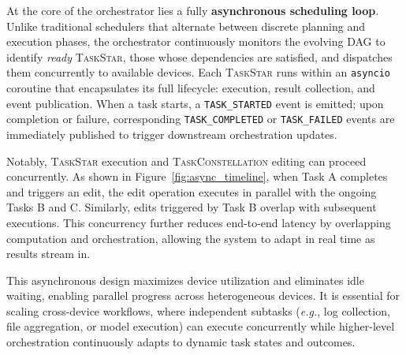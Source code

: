\documentclass[10pt]{article} %
\newcommand{\TaskConstellation}{\textsc{TaskConstellation}\xspace}
\newcommand{\TaskStar}{\textsc{TaskStar}\xspace}
\newcommand{\eg}{\textit{e.g.},\xspace}
\begin{document}
At the core of the orchestrator lies a fully \textbf{asynchronous scheduling loop}. Unlike traditional schedulers that alternate between discrete planning and execution phases, the orchestrator continuously monitors the evolving DAG to identify \emph{ready} \TaskStar, those whose dependencies are satisfied, and dispatches them concurrently to available devices. Each \TaskStar runs within an \texttt{asyncio} coroutine that encapsulates its full lifecycle: execution, result collection, and event publication. When a task starts, a \texttt{TASK\_STARTED} event is emitted; upon completion or failure, corresponding \texttt{TASK\_COMPLETED} or \texttt{TASK\_FAILED} events are immediately published to trigger downstream orchestration updates.

Notably, \TaskStar execution and \TaskConstellation editing can proceed concurrently. As shown in Figure~\ref{fig:async_timeline}, when Task A completes and triggers an edit, the edit operation executes in parallel with the ongoing Tasks B and C. Similarly, edits triggered by Task B overlap with subsequent executions. This concurrency further reduces end-to-end latency by overlapping computation and orchestration, allowing the system to adapt in real time as results stream in.

This asynchronous design maximizes device utilization and eliminates idle waiting, enabling parallel progress across heterogeneous devices. It is essential for scaling cross-device workflows, where independent subtasks (\eg log collection, file aggregation, or model execution) can execute concurrently while higher-level orchestration continuously adapts to dynamic task states and outcomes.
\end{document}
